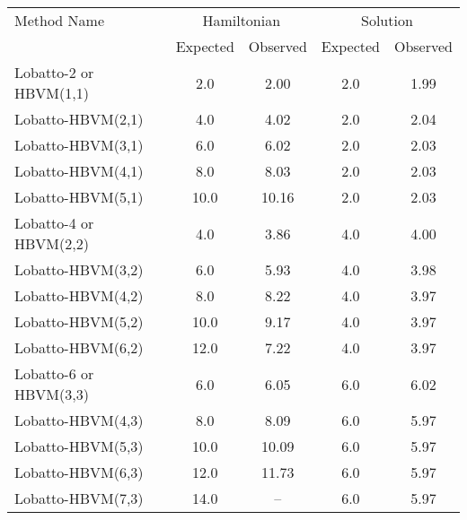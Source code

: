 \begin{tabular}{l|cccc}
\toprule
           Method Name & \multicolumn{2}{c}{Hamiltonian} & \multicolumn{2}{c}{Solution} \\
                       &    Expected & Observed & Expected & Observed \\
\midrule
Lobatto-2 or HBVM(1,1) &         2.0 &     2.00 &      2.0 &     1.99 \\
     Lobatto-HBVM(2,1) &         4.0 &     4.02 &      2.0 &     2.04 \\
     Lobatto-HBVM(3,1) &         6.0 &     6.02 &      2.0 &     2.03 \\
     Lobatto-HBVM(4,1) &         8.0 &     8.03 &      2.0 &     2.03 \\
     Lobatto-HBVM(5,1) &        10.0 &    10.16 &      2.0 &     2.03 \\
Lobatto-4 or HBVM(2,2) &         4.0 &     3.86 &      4.0 &     4.00 \\
     Lobatto-HBVM(3,2) &         6.0 &     5.93 &      4.0 &     3.98 \\
     Lobatto-HBVM(4,2) &         8.0 &     8.22 &      4.0 &     3.97 \\
     Lobatto-HBVM(5,2) &        10.0 &     9.17 &      4.0 &     3.97 \\
     Lobatto-HBVM(6,2) &        12.0 &     7.22 &      4.0 &     3.97 \\
Lobatto-6 or HBVM(3,3) &         6.0 &     6.05 &      6.0 &     6.02 \\
     Lobatto-HBVM(4,3) &         8.0 &     8.09 &      6.0 &     5.97 \\
     Lobatto-HBVM(5,3) &        10.0 &    10.09 &      6.0 &     5.97 \\
     Lobatto-HBVM(6,3) &        12.0 &    11.73 &      6.0 &     5.97 \\
     Lobatto-HBVM(7,3) &        14.0 &       -- &      6.0 &     5.97 \\
\bottomrule
\end{tabular}

